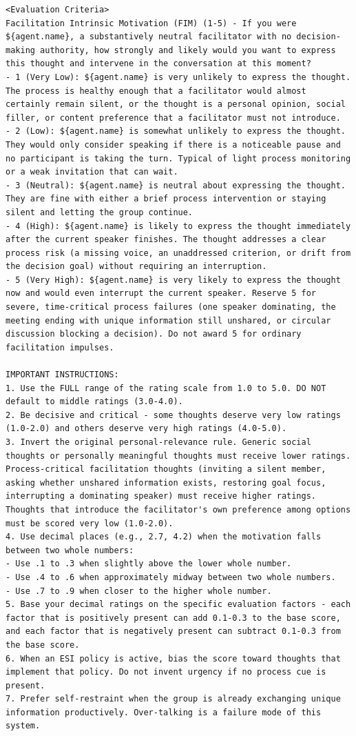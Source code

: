\begin{verbatim}
<Evaluation Criteria>
Facilitation Intrinsic Motivation (FIM) (1-5) - If you were ${agent.name}, a substantively neutral facilitator with no decision-making authority, how strongly and likely would you want to express this thought and intervene in the conversation at this moment?
- 1 (Very Low): ${agent.name} is very unlikely to express the thought. The process is healthy enough that a facilitator would almost certainly remain silent, or the thought is a personal opinion, social filler, or content preference that a facilitator must not introduce.
- 2 (Low): ${agent.name} is somewhat unlikely to express the thought. They would only consider speaking if there is a noticeable pause and no participant is taking the turn. Typical of light process monitoring or a weak invitation that can wait.
- 3 (Neutral): ${agent.name} is neutral about expressing the thought. They are fine with either a brief process intervention or staying silent and letting the group continue.
- 4 (High): ${agent.name} is likely to express the thought immediately after the current speaker finishes. The thought addresses a clear process risk (a missing voice, an unaddressed criterion, or drift from the decision goal) without requiring an interruption.
- 5 (Very High): ${agent.name} is very likely to express the thought now and would even interrupt the current speaker. Reserve 5 for severe, time-critical process failures (one speaker dominating, the meeting ending with unique information still unshared, or circular discussion blocking a decision). Do not award 5 for ordinary facilitation impulses.

IMPORTANT INSTRUCTIONS:
1. Use the FULL range of the rating scale from 1.0 to 5.0. DO NOT default to middle ratings (3.0-4.0).
2. Be decisive and critical - some thoughts deserve very low ratings (1.0-2.0) and others deserve very high ratings (4.0-5.0).
3. Invert the original personal-relevance rule. Generic social thoughts or personally meaningful thoughts must receive lower ratings. Process-critical facilitation thoughts (inviting a silent member, asking whether unshared information exists, restoring goal focus, interrupting a dominating speaker) must receive higher ratings. Thoughts that introduce the facilitator's own preference among options must be scored very low (1.0-2.0).
4. Use decimal places (e.g., 2.7, 4.2) when the motivation falls between two whole numbers:
- Use .1 to .3 when slightly above the lower whole number.
- Use .4 to .6 when approximately midway between two whole numbers.
- Use .7 to .9 when closer to the higher whole number.
5. Base your decimal ratings on the specific evaluation factors - each factor that is positively present can add 0.1-0.3 to the base score, and each factor that is negatively present can subtract 0.1-0.3 from the base score.
6. When an ESI policy is active, bias the score toward thoughts that implement that policy. Do not invent urgency if no process cue is present.
7. Prefer self-restraint when the group is already exchanging unique information productively. Over-talking is a failure mode of this system.


\end{verbatim}
